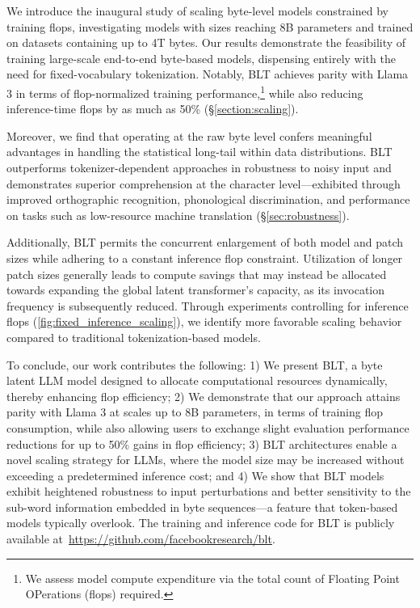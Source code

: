 We introduce the inaugural study of scaling byte-level models constrained by training flops, investigating models with sizes reaching 8B parameters and trained on datasets containing up to 4T bytes. Our results demonstrate the feasibility of training large-scale end-to-end byte-based models, dispensing entirely with the need for fixed-vocabulary tokenization. Notably, {\textsc BLT} achieves parity with Llama 3 in terms of flop-normalized training performance,\footnote{We assess model compute expenditure via the total count of Floating Point OPerations (flops) required.} while also reducing inference-time flops by as much as 50\% (\S\ref{section:scaling}). 

Moreover, we find that operating at the raw byte level confers meaningful advantages in handling the statistical long-tail within data distributions. {\textsc BLT} outperforms tokenizer-dependent approaches in robustness to noisy input and demonstrates superior comprehension at the character level—exhibited through improved orthographic recognition, phonological discrimination, and performance on tasks such as low-resource machine translation (\S\ref{sec:robustness}).

Additionally, {\textsc BLT} permits the concurrent enlargement of both model and patch sizes while adhering to a constant inference flop constraint. Utilization of longer patch sizes generally leads to compute savings that may instead be allocated towards expanding the global latent transformer's capacity, as its invocation frequency is subsequently reduced. Through experiments controlling for inference flops (\autoref{fig:fixed_inference_scaling}), we identify more favorable scaling behavior compared to traditional tokenization-based models.

To conclude, our work contributes the following: 1) We present {\textsc BLT}, a byte latent LLM model designed to allocate computational resources dynamically, thereby enhancing flop efficiency; 2) We demonstrate that our approach attains parity with Llama 3 at scales up to 8B parameters, in terms of training flop consumption, while also allowing users to exchange slight evaluation performance reductions for up to 50\% gains in flop efficiency; 3) {\textsc BLT} architectures enable a novel scaling strategy for LLMs, where the model size may be increased without exceeding a predetermined inference cost; and 4) We show that {\textsc BLT} models exhibit heightened robustness to input perturbations and better sensitivity to the sub-word information embedded in byte sequences—a feature that token-based models typically overlook. The training and inference code for {\textsc BLT} is publicly available at~\url{https://github.com/facebookresearch/blt}.

